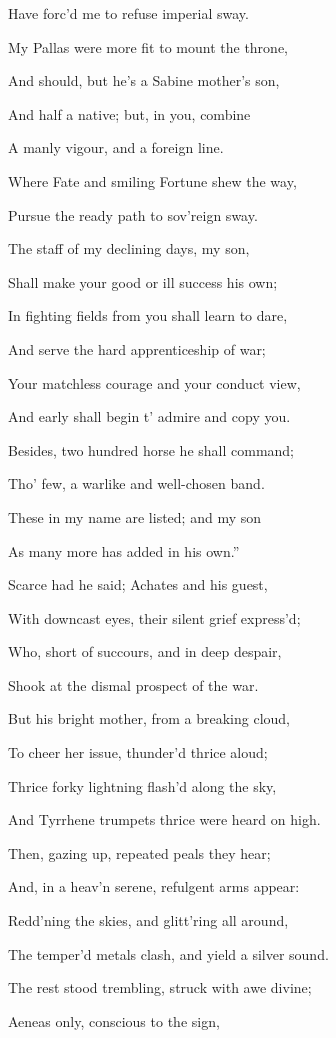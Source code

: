 Have forc’d me to refuse imperial sway.

My Pallas were more fit to mount the throne,

And should, but he’s a Sabine mother’s son,

And half a native; but, in you, combine

A manly vigour, and a foreign line.

Where Fate and smiling Fortune shew the way,

Pursue the ready path to sov’reign sway.

The staff of my declining days, my son,

Shall make your good or ill success his own;

In fighting fields from you shall learn to dare,

And serve the hard apprenticeship of war;

Your matchless courage and your conduct view,

And early shall begin t’ admire and copy you.

Besides, two hundred horse he shall command;

Tho’ few, a warlike and well-chosen band.

These in my name are listed; and my son

As many more has added in his own.”

Scarce had he said; Achates and his guest,

With downcast eyes, their silent grief express’d;

Who, short of succours, and in deep despair,

Shook at the dismal prospect of the war.

But his bright mother, from a breaking cloud,

To cheer her issue, thunder’d thrice aloud;

Thrice forky lightning flash’d along the sky,

And Tyrrhene trumpets thrice were heard on high.

Then, gazing up, repeated peals they hear;

And, in a heav’n serene, refulgent arms appear:

Redd’ning the skies, and glitt’ring all around,

The temper’d metals clash, and yield a silver sound.

The rest stood trembling, struck with awe divine;

Aeneas only, conscious to the sign,

